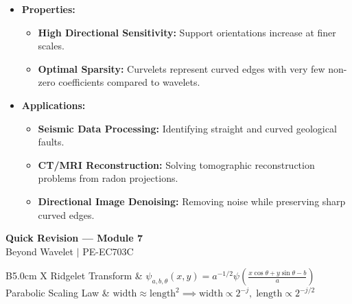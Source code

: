 \documentclass[12pt,a4paper]{article}
\renewcommand{\arraystretch}{1.45}
\begin{document}
\begin{itemize}[leftmargin=*, itemsep=4.5pt]
  \item \textbf{Properties:} 
        \begin{itemize}[leftmargin=*, itemsep=2.5pt, topsep=2pt]
          \item \textbf{High Directional Sensitivity:} Support orientations increase at finer scales.
          \item \textbf{Optimal Sparsity:} Curvelets represent curved edges with very few non-zero coefficients compared to wavelets.
        \end{itemize}
  \item \textbf{Applications:}
        \begin{itemize}[leftmargin=*, itemsep=2.5pt, topsep=2pt]
          \item \textbf{Seismic Data Processing:} Identifying straight and curved geological faults.
          \item \textbf{CT/MRI Reconstruction:} Solving tomographic reconstruction problems from radon projections.
          \item \textbf{Directional Image Denoising:} Removing noise while preserving sharp curved edges.
        \end{itemize}
\end{itemize}

\newpage
\begin{center}
  {\large\bfseries\color{myred} Quick Revision --- Module 7}\\[3pt]
  {\small\color{mydark} Beyond Wavelet $|$ PE-EC703C}
\end{center}
\noindent{\color{myred}\rule{\linewidth}{1.2pt}}
\vspace{4pt}

\begin{tcolorbox}[formulabox, title={\textbf{Key Equations}}]
\renewcommand{\arraystretch}{1.35}
\begin{tabularx}{\linewidth}{B{5.0cm} X}
Ridgelet Transform & $\psi_{a,b,\theta}(x, y) = a^{-1/2} \psi\left(\frac{x \cos\theta + y \sin\theta - b}{a}\right)$ \\[12pt]
Parabolic Scaling Law & $\text{width} \approx \text{length}^2 \implies \text{width} \propto 2^{-j}, \; \text{length} \propto 2^{-j/2}$
\end{tabularx}
\end{tcolorbox}
\end{document}
